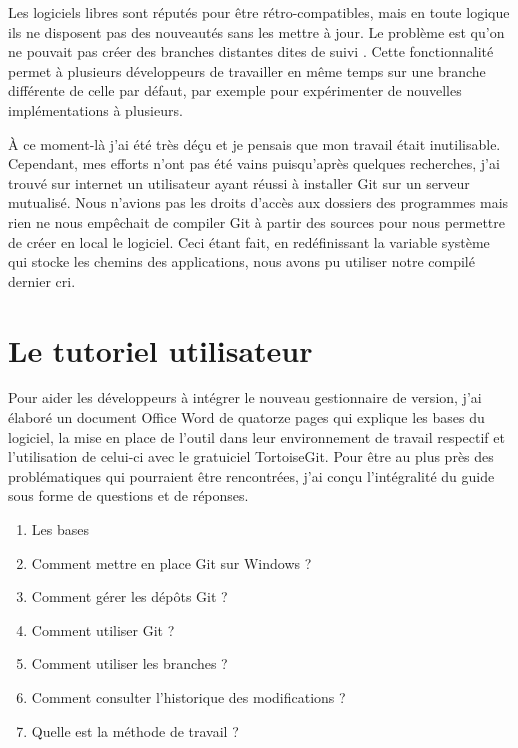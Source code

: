 Les logiciels libres sont réputés pour être rétro-compatibles, mais en
toute logique ils ne disposent pas des nouveautés sans les mettre à
jour.  Le problème est qu'on ne pouvait pas créer des branches distantes
dites \og de suivi \fg{}. Cette fonctionnalité permet à plusieurs
développeurs de travailler en même temps sur une branche différente de
celle par défaut, par exemple pour expérimenter de nouvelles
implémentations à plusieurs.

À ce moment-là j'ai été très déçu et je pensais que mon travail était
inutilisable.  Cependant, mes efforts n'ont pas été vains puisqu'après
quelques recherches, j'ai trouvé sur internet un utilisateur ayant
réussi à installer Git sur un serveur mutualisé.  Nous n'avions pas les
droits d'accès aux dossiers des programmes mais rien ne nous empêchait
de compiler Git à partir des sources pour nous permettre de créer en
local le logiciel. Ceci étant fait, en redéfinissant la variable système
qui stocke les chemins des applications, nous avons pu utiliser notre
compilé dernier cri.

\section{Le tutoriel utilisateur} %
\label{sec:Le tutoriel utilisateur}

Pour aider les développeurs à intégrer le nouveau gestionnaire de
version, j'ai élaboré un document Office Word de quatorze pages qui
explique les bases du logiciel, la mise en place de l'outil dans leur
environnement de travail respectif et l'utilisation de celui-ci avec le
gratuiciel TortoiseGit.  Pour être au plus près des problématiques qui
pourraient être rencontrées, j'ai conçu l'intégralité du guide sous
forme de questions et de réponses.

\begin{enumerate}
  \item Les bases
  \item Comment mettre en place Git sur Windows ?
  \item Comment gérer les dépôts Git ?
  \item Comment utiliser Git ?
  \item Comment utiliser les branches ?
  \item Comment consulter l'historique des modifications ?
  \item Quelle est la méthode de travail ?
\end{enumerate}

